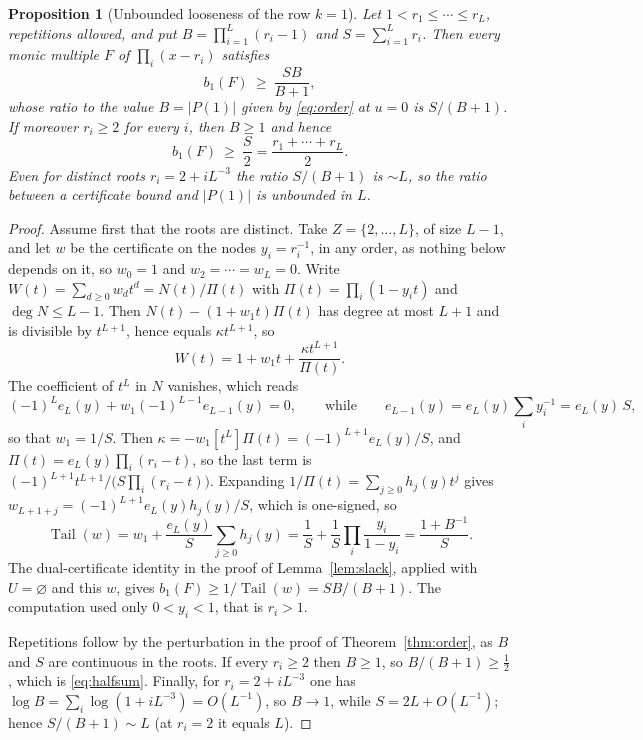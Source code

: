 \documentclass[11pt]{article}
\newtheorem{proposition}[theorem]{Proposition}
\DeclareMathOperator{\Tail}{Tail}
\begin{document}
\begin{proposition}[Unbounded looseness of the row $k=1$]
\label{prop:unbounded}
Let $1<r_1\le\cdots\le r_L$, repetitions allowed, and put
$B=\prod_{i=1}^L(r_i-1)$ and $S=\sum_{i=1}^Lr_i$.  Then every monic multiple
$F$ of $\prod_i(x-r_i)$ satisfies
\[
  b_1(F)\ \ge\ \frac{SB}{B+1},
\]
whose ratio to the value $B=|P(1)|$ given by \eqref{eq:order} at $u=0$ is
$S/(B+1)$.  If moreover $r_i\ge2$ for every $i$, then $B\ge1$ and hence
\begin{equation}\label{eq:halfsum}
  b_1(F)\ \ge\ \frac S2=\frac{r_1+\cdots+r_L}2 .
\end{equation}
Even for distinct roots $r_i=2+iL^{-3}$ the ratio $S/(B+1)$ is $\sim L$, so the ratio
between a certificate bound and $|P(1)|$ is unbounded in $L$.
\end{proposition}

\begin{proof}
Assume first that the roots are distinct.  Take $Z=\{2,\ldots,L\}$, of size
$L-1$, and let $w$ be the certificate on the
nodes $y_i=r_i^{-1}$, in any order, as nothing below depends on it, so $w_0=1$ and $w_2=\cdots=w_L=0$.  Write
$W(t)=\sum_{d\ge0}w_dt^d=N(t)/\Pi(t)$ with $\Pi(t)=\prod_i(1-y_it)$ and
$\deg N\le L-1$.  Then $N(t)-(1+w_1t)\Pi(t)$ has degree at most $L+1$ and is
divisible by $t^{L+1}$, hence equals $\kappa t^{L+1}$, so
\[
  W(t)=1+w_1t+\frac{\kappa t^{L+1}}{\Pi(t)} .
\]
The coefficient of $t^L$ in $N$ vanishes, which reads
\[
  (-1)^Le_L(y)+w_1(-1)^{L-1}e_{L-1}(y)=0,
  \qquad\text{while}\qquad
  e_{L-1}(y)=e_L(y)\sum_{i}y_i^{-1}=e_L(y)\,S,
\]
so that $w_1=1/S$.  Then
$\kappa=-w_1[t^L]\Pi(t)=(-1)^{L+1}e_L(y)/S$, and $\Pi(t)=e_L(y)\prod_i(r_i-t)$,
so the last term is $(-1)^{L+1}t^{L+1}/\bigl(S\prod_i(r_i-t)\bigr)$.
Expanding $1/\Pi(t)=\sum_{j\ge0}h_j(y)t^j$ gives
$w_{L+1+j}=(-1)^{L+1}e_L(y)h_j(y)/S$, which is one-signed, so
\[
  \Tail(w)=w_1+\frac{e_L(y)}S\sum_{j\ge0}h_j(y)
  =\frac1S+\frac1S\prod_{i}\frac{y_i}{1-y_i}
  =\frac{1+B^{-1}}S .
\]
The dual-certificate identity in the proof of Lemma~\ref{lem:slack}, applied
with $U=\varnothing$ and this $w$, gives $b_1(F)\ge1/\Tail(w)=SB/(B+1)$.  The
computation used only $0<y_i<1$, that is $r_i>1$.

Repetitions follow by the perturbation in the proof of
Theorem~\ref{thm:order}, as $B$ and $S$ are continuous in the roots.  If
every $r_i\ge2$ then $B\ge1$, so $B/(B+1)\ge\tfrac12$, which is
\eqref{eq:halfsum}.  Finally, for $r_i=2+iL^{-3}$ one has
$\log B=\sum_i\log(1+iL^{-3})=O(L^{-1})$, so $B\to1$, while
$S=2L+O(L^{-1})$; hence $S/(B+1)\sim L$ (at $r_i=2$ it equals $L$).
\end{proof}
\end{document}

